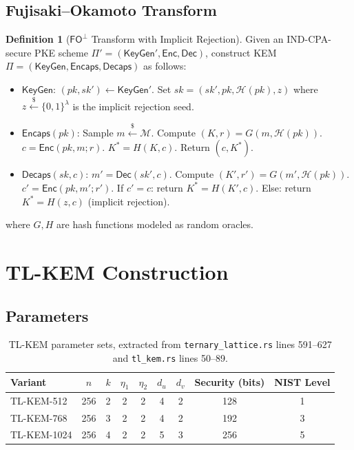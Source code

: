 \documentclass[11pt,a4paper]{article}
\theoremstyle{definition}
\newtheorem{definition}[theorem]{Definition}
\newcommand{\KeyGen}{\textsf{KeyGen}}
\newcommand{\Enc}{\textsf{Enc}}
\newcommand{\Dec}{\textsf{Dec}}
\newcommand{\Encaps}{\textsf{Encaps}}
\newcommand{\Decaps}{\textsf{Decaps}}
\newcommand{\FO}{\textsf{FO}}
\newcommand{\Hash}{\mathcal{H}}
\begin{document}
\subsection{Fujisaki--Okamoto Transform}

\begin{definition}[$\FO^{\bot}$ Transform with Implicit Rejection]
\label{def:fo}
Given an IND-CPA-secure PKE scheme $\Pi' = (\KeyGen', \Enc, \Dec)$, construct KEM $\Pi = (\KeyGen, \Encaps, \Decaps)$ as follows:
\begin{itemize}[leftmargin=2em]
  \item $\KeyGen$: $(pk, sk') \leftarrow \KeyGen'$. Set $sk = (sk', pk, \Hash(pk), z)$ where $z \xleftarrow{\$} \{0,1\}^\lambda$ is the implicit rejection seed.
  \item $\Encaps(pk)$: Sample $m \xleftarrow{\$} \mathcal{M}$. Compute $(K, r) = G(m, \Hash(pk))$. $c = \Enc(pk, m; r)$. $K^* = H(K, c)$. Return $(c, K^*)$.
  \item $\Decaps(sk, c)$: $m' = \Dec(sk', c)$. Compute $(K', r') = G(m', \Hash(pk))$. $c' = \Enc(pk, m'; r')$. If $c' = c$: return $K^* = H(K', c)$. Else: return $K^* = H(z, c)$ (implicit rejection).
\end{itemize}
where $G, H$ are hash functions modeled as random oracles.
\end{definition}

\section{TL-KEM Construction}
\label{sec:construction}

\subsection{Parameters}
\label{sec:params}

\begin{table}[ht]
\centering
\caption{TL-KEM parameter sets, extracted from \texttt{ternary\_lattice.rs} lines 591--627 and \texttt{tl\_kem.rs} lines 50--89.}
\label{tab:params}
\begin{tabular}{@{}lcccccccc@{}}
\toprule
Variant & $n$ & $k$ & $\eta_1$ & $\eta_2$ & $d_u$ & $d_v$ & Security (bits) & NIST Level \\
\midrule
TL-KEM-512  & 256 & 2 & 2 & 2 & 4 & 2 & 128 & 1 \\
TL-KEM-768  & 256 & 3 & 2 & 2 & 4 & 2 & 192 & 3 \\
TL-KEM-1024 & 256 & 4 & 2 & 2 & 5 & 3 & 256 & 5 \\
\bottomrule
\end{tabular}
\end{table}
\end{document}
